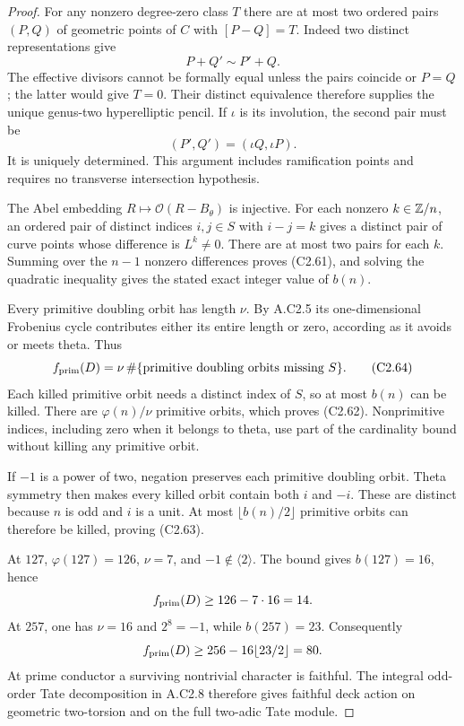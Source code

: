 \begin{proof}
For any nonzero degree-zero class $T$ there are
at most two ordered pairs $(P,Q)$ of geometric
points of $C$ with $[P-Q]=T$.
Indeed two distinct representations give
\[
                         P+Q'\sim P'+Q.
\]
The effective divisors cannot be formally equal
unless the pairs coincide or $P=Q$; the latter
would give $T=0$. Their distinct equivalence
therefore supplies the unique genus-two
hyperelliptic pencil. If $\iota$ is its
involution, the second pair must be
\[
                      (P',Q')=(\iota Q,\iota P).
\]
It is uniquely determined. This argument includes
ramification points and requires no transverse
intersection hypothesis.

The Abel embedding $R\mapsto\mathcal O(R-B_\theta)$
is injective. For each nonzero $k\in\mathbb Z/n$, an
ordered pair of distinct indices $i,j\in S$
with $i-j=k$ gives a distinct pair of curve
points whose difference is $L^k\ne0$.
There are at most two pairs for each $k$.
Summing over the $n-1$ nonzero differences proves
(C2.61), and solving the quadratic inequality
gives the stated exact integer value of $b(n)$.

Every primitive doubling orbit has length $\nu$.
By A.C2.5 its one-dimensional Frobenius cycle
contributes either its entire length or zero,
according as it avoids or meets theta.
Thus
\[
 f_{\rm prim}(D)=\nu\,
   \#\{\text{primitive doubling orbits missing }S\}.
                                                               \tag{C2.64}
\]
Each killed primitive orbit needs a distinct
index of $S$, so at most $b(n)$ can be killed.
There are $\varphi(n)/\nu$ primitive orbits,
which proves (C2.62).
Nonprimitive indices, including zero when it
belongs to theta, use part of the cardinality
bound without killing any primitive orbit.

If $-1$ is a power of two, negation preserves
each primitive doubling orbit. Theta symmetry
then makes every killed orbit contain both
$i$ and $-i$. These are distinct because $n$
is odd and $i$ is a unit. At most
$\lfloor b(n)/2\rfloor$ primitive orbits can
therefore be killed, proving (C2.63).

At $127$, $\varphi(127)=126$, $\nu=7$, and
$-1\notin\langle2\rangle$. The bound gives
$b(127)=16$, hence
\[
                    f_{\rm prim}(D)\ge126-7\cdot16=14.
\]
At $257$, one has $\nu=16$ and $2^8=-1$,
while $b(257)=23$. Consequently
\[
              f_{\rm prim}(D)\ge
                         256-16\lfloor23/2\rfloor=80.
\]
At prime conductor a surviving nontrivial
character is faithful. The integral odd-order
Tate decomposition in A.C2.8 therefore gives
faithful deck action on geometric two-torsion
and on the full two-adic Tate module.


\end{proof}
